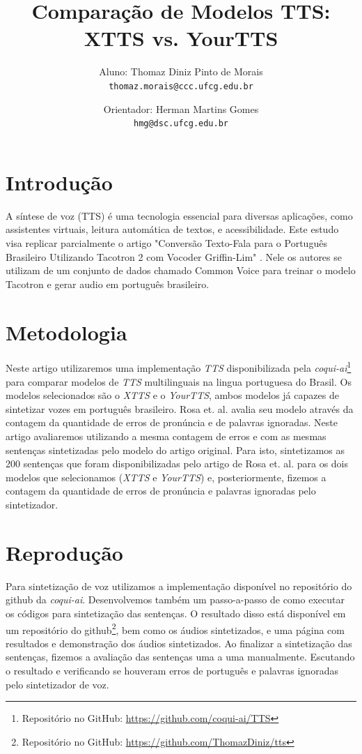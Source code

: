 \documentclass[a4paper,12pt]{article}
\title{Comparação de Modelos TTS: XTTS vs. YourTTS}
\author{
  Aluno: Thomaz Diniz Pinto de Morais\\
  \texttt{thomaz.morais@ccc.ufcg.edu.br}
  \and
  Orientador: Herman Martins Gomes\\
  \texttt{hmg@dsc.ufcg.edu.br}
}
\date{}
\begin{document}
\maketitle

\section{Introdução}
	A síntese de voz (TTS) é uma tecnologia essencial para diversas aplicações, como assistentes virtuais, leitura automática de textos, e acessibilidade. Este estudo visa replicar parcialmente o artigo "Conversão Texto-Fala para o Português Brasileiro Utilizando Tacotron 2 com Vocoder Griffin-Lim" \cite{rosa2021ttsptbr}. Nele os autores se utilizam de um conjunto de dados chamado Common Voice para treinar o modelo Tacotron e gerar audio em português brasileiro. 
 

\section{Metodologia}

	Neste artigo utilizaremos uma implementação \textit{TTS} disponibilizada pela \textit{coqui-ai}\footnote{Repositório no GitHub: \url{https://github.com/coqui-ai/TTS}} para comparar modelos de \textit{TTS} multilinguais na lingua portuguesa do Brasil. Os modelos selecionados são o \textit{XTTS} e o \textit{YourTTS}, ambos modelos já capazes de sintetizar vozes em português brasileiro.
	Rosa et. al. \cite{rosa2021ttsptbr} avalia seu modelo através da contagem da quantidade de erros de pronúncia e de palavras ignoradas. Neste artigo avaliaremos utilizando a mesma contagem de erros e com as mesmas sentenças sintetizadas pelo modelo do artigo original. Para isto, sintetizamos as 200 sentenças que foram disponibilizadas pelo artigo de Rosa et. al. para os dois modelos que selecionamos (\textit{XTTS} e \textit{YourTTS}) e, posteriormente, fizemos a contagem da quantidade de erros de pronúncia e palavras ignoradas pelo sintetizador.
	
\section{Reprodução}

	Para sintetização de voz utilizamos a implementação disponível no repositório do github da \textit{coqui-ai}. Desenvolvemos também um passo-a-passo de como executar os códigos para sintetização das sentenças. O resultado disso está disponível em um repositório do github\footnote{Repositório no GitHub: \url{https://github.com/ThomazDiniz/tts}}, bem como os áudios sintetizados, e uma página com resultados e demonstração dos áudios sintetizados.  Ao finalizar a sintetização das sentenças, fizemos a avaliação das sentenças uma a uma manualmente. Escutando o resultado e verificando se houveram erros de português e palavras ignoradas pelo sintetizador de voz.
\end{document}

